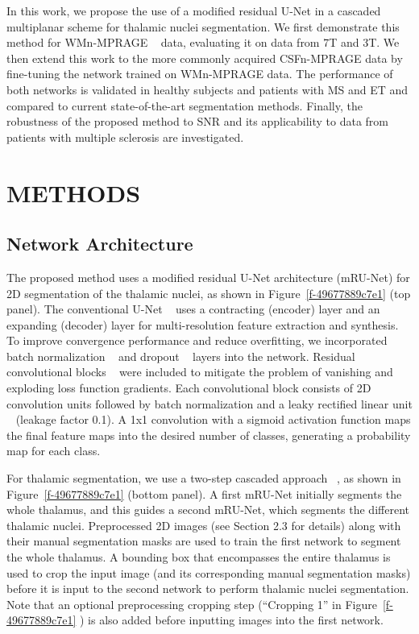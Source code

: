 In this work, we propose the use of a modified residual U-Net in a cascaded multiplanar scheme for thalamic nuclei segmentation. We first demonstrate this method for WMn-MPRAGE \unskip~\cite{1643371:26789961} data, evaluating it on data from 7T and 3T. We then extend this work to the more commonly acquired CSFn-MPRAGE data by fine-tuning the network trained on WMn-MPRAGE data. The performance of both networks is validated in healthy subjects and patients with MS and ET and compared to current state-of-the-art segmentation methods. Finally, the robustness of the proposed method to SNR and its applicability to data from patients with multiple sclerosis are investigated.
    
\section{METHODS}




\subsection{Network Architecture} The proposed method uses a modified residual U-Net architecture (mRU-Net) for 2D segmentation of the thalamic nuclei, as shown in Figure~\ref{f-49677889c7e1}  (top panel). The conventional U-Net \unskip~\cite{1643371:26789965} uses a contracting (encoder) layer and an expanding (decoder) layer for multi-resolution feature extraction and synthesis. To improve convergence performance and reduce overfitting, we incorporated batch normalization \unskip~\cite{1643371:26789970} and dropout \unskip~\cite{1643371:26789907} layers into the network. Residual convolutional blocks \unskip~\cite{1643371:26789905} were included to mitigate the problem of vanishing and exploding loss function gradients. Each convolutional block consists of 2D convolution units followed by batch normalization and a leaky rectified linear unit \unskip~\cite{1643371:26789910} (leakage factor 0.1). A 1x1 convolution with a sigmoid activation function maps the final feature maps into the desired number of classes, generating a probability map for each class. 

For thalamic segmentation, we use a two-step cascaded approach \unskip~\cite{1643371:26789931}, as shown in Figure~\ref{f-49677889c7e1}  (bottom panel). A first mRU-Net initially segments the whole thalamus, and this guides a second mRU-Net, which segments the different thalamic nuclei. Preprocessed 2D images (see Section 2.3 for details) along with their manual segmentation masks are used to train the first network to segment the whole thalamus. A bounding box that encompasses the entire thalamus is used to crop the input image (and its corresponding manual segmentation masks) before it is input to the second network to perform thalamic nuclei segmentation. Note that an optional preprocessing cropping step (``Cropping 1'' in Figure~\ref{f-49677889c7e1} ) is also added before inputting images into the first network.

